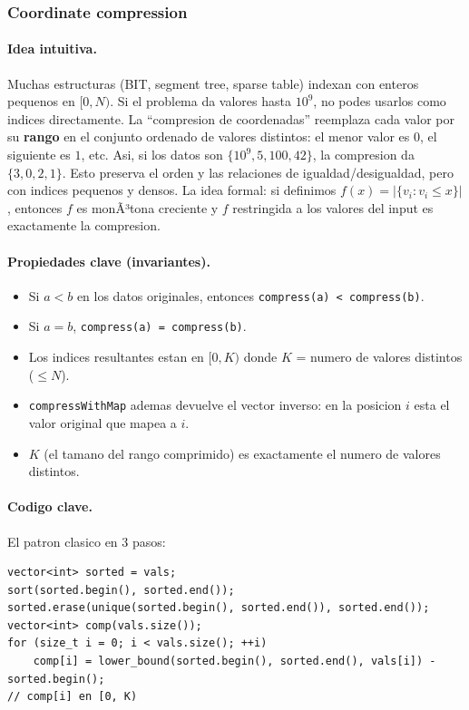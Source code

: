 ﻿\subsubsection{Coordinate compression}

\paragraph{Idea intuitiva.}
Muchas estructuras (BIT, segment tree, sparse table) indexan con enteros pequenos en $[0, N)$. Si el problema da valores hasta $10^9$, no podes usarlos como indices directamente. La ``compresion de coordenadas'' reemplaza cada valor por su \textbf{rango} en el conjunto ordenado de valores distintos: el menor valor es $0$, el siguiente es $1$, etc. Asi, si los datos son $\{10^9, 5, 100, 42\}$, la compresion da $\{3, 0, 2, 1\}$. Esto preserva el orden y las relaciones de igualdad/desigualdad, pero con indices pequenos y densos. La idea formal: si definimos $f(x) = |\{v_i : v_i \le x\}|$, entonces $f$ es monÃ³tona creciente y $f$ restringida a los valores del input es exactamente la compresion.

\paragraph{Propiedades clave (invariantes).}
\begin{itemize}\setlength\itemsep{0pt}
	\item Si $a < b$ en los datos originales, entonces \texttt{compress(a) < compress(b)}.
	\item Si $a = b$, \texttt{compress(a) = compress(b)}.
	\item Los indices resultantes estan en $[0, K)$ donde $K$ = numero de valores distintos ($\le N$).
	\item \texttt{compressWithMap} ademas devuelve el vector inverso: en la posicion $i$ esta el valor original que mapea a $i$.
	\item $K$ (el tamano del rango comprimido) es exactamente el numero de valores distintos.
\end{itemize}

\paragraph{Codigo clave.}
El patron clasico en 3 pasos:
\begin{verbatim}
vector<int> sorted = vals;
sort(sorted.begin(), sorted.end());
sorted.erase(unique(sorted.begin(), sorted.end()), sorted.end());
vector<int> comp(vals.size());
for (size_t i = 0; i < vals.size(); ++i)
    comp[i] = lower_bound(sorted.begin(), sorted.end(), vals[i]) - sorted.begin();
// comp[i] en [0, K)
\end{verbatim}

